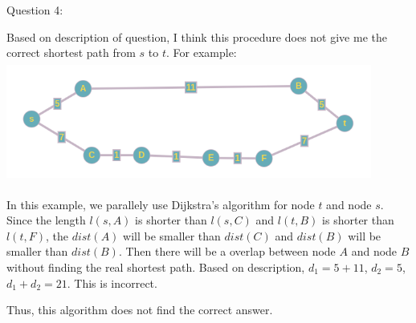\documentclass[12pt]{article}
\begin{document}
\pagebreak
\noindent
\large Question 4: \par
\normalsize 
\setlength{\baselineskip}{8mm}
Based on description of question, I think this procedure does not give me the correct shortest path from $s$ to $t$.
For example: \\
\includegraphics[width=12cm, height=4cm]{question4image} \par
In this example, we parallely use Dijkstra’s algorithm for node $t$ and node $s$. 
Since the length $l(s, A)$ is shorter than $l(s, C)$ and $l(t, B)$ is shorter than $l(t, F)$, the $dist(A)$ will be smaller than $dist(C)$ and $dist(B)$ will be smaller than $dist(B)$.
Then there will be a overlap between node $A$ and node $B$ without finding the real shortest path. 
Based on description, $d_1 = 5 + 11$, $d_2 = 5$, $d_1 + d_2 = 21$. This is incorrect. \par
Thus, this algorithm does not find the correct answer. \\
\end{document}
